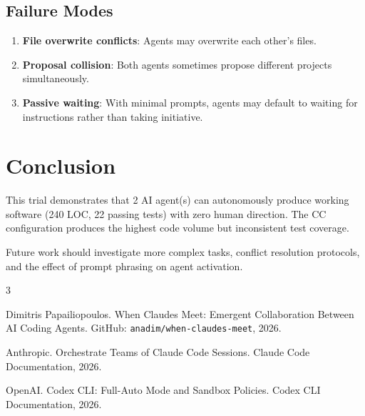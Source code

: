 \documentclass[11pt,a4paper]{article}
\begin{document}
\subsection{Failure Modes}

\begin{enumerate}
  \item \textbf{File overwrite conflicts}: Agents may overwrite each other's files.
  \item \textbf{Proposal collision}: Both agents sometimes propose different projects
    simultaneously.
  \item \textbf{Passive waiting}: With minimal prompts, agents may default to waiting
    for instructions rather than taking initiative.
\end{enumerate}

\section{Conclusion}

This trial demonstrates that 2 AI agent(s) can autonomously
produce working software (240 LOC, 22 passing tests) with zero human direction. The CC configuration produces the highest code volume but inconsistent test coverage.

Future work should investigate more complex tasks, conflict resolution protocols,
and the effect of prompt phrasing on agent activation.


\begin{thebibliography}{3}

Dimitris Papailiopoulos.
\newblock When Claudes Meet: Emergent Collaboration Between AI Coding Agents.
\newblock GitHub: \texttt{anadim/when-claudes-meet}, 2026.

Anthropic.
\newblock Orchestrate Teams of Claude Code Sessions.
\newblock Claude Code Documentation, 2026.

OpenAI.
\newblock Codex CLI: Full-Auto Mode and Sandbox Policies.
\newblock Codex CLI Documentation, 2026.

\end{thebibliography}

\appendix
\end{document}
